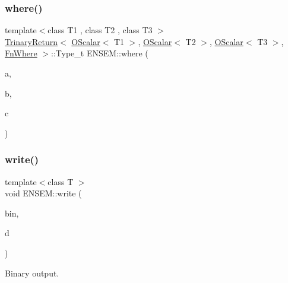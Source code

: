 \subsubsection{\texorpdfstring{where()}{where()}}
{\footnotesize\ttfamily template$<$class T1 , class T2 , class T3 $>$ \\
\mbox{\hyperlink{structENSEM_1_1TrinaryReturn}{Trinary\+Return}}$<$ \mbox{\hyperlink{classENSEM_1_1OScalar}{O\+Scalar}}$<$ T1 $>$, \mbox{\hyperlink{classENSEM_1_1OScalar}{O\+Scalar}}$<$ T2 $>$, \mbox{\hyperlink{classENSEM_1_1OScalar}{O\+Scalar}}$<$ T3 $>$, \mbox{\hyperlink{structENSEM_1_1FnWhere}{Fn\+Where}} $>$\+::Type\+\_\+t E\+N\+S\+E\+M\+::where (\begin{DoxyParamCaption}\item[{const \mbox{\hyperlink{classENSEM_1_1OScalar}{O\+Scalar}}$<$ T1 $>$ \&}]{a,  }\item[{const \mbox{\hyperlink{classENSEM_1_1OScalar}{O\+Scalar}}$<$ T2 $>$ \&}]{b,  }\item[{const \mbox{\hyperlink{classENSEM_1_1OScalar}{O\+Scalar}}$<$ T3 $>$ \&}]{c }\end{DoxyParamCaption})\hspace{0.3cm}{\ttfamily [inline]}}

\mbox{\label{group__obsscalar_ga921d40c8afba8e09044b5c679c71b495}} 
\subsubsection{\texorpdfstring{write()}{write()}}
{\footnotesize\ttfamily template$<$class T $>$ \\
void E\+N\+S\+E\+M\+::write (\begin{DoxyParamCaption}\item[{\mbox{\hyperlink{classADATIO_1_1BinaryWriter}{A\+D\+A\+T\+I\+O\+::\+Binary\+Writer}} \&}]{bin,  }\item[{const \mbox{\hyperlink{classENSEM_1_1OScalar}{O\+Scalar}}$<$ T $>$ \&}]{d }\end{DoxyParamCaption})\hspace{0.3cm}{\ttfamily [inline]}}



Binary output. 

